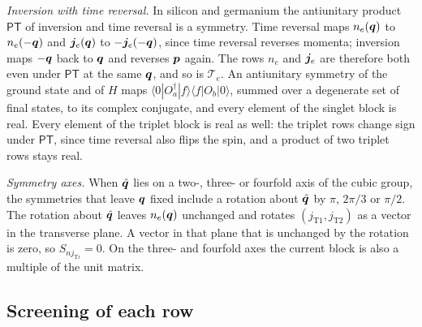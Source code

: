 \emph{Inversion with time reversal.} In silicon and germanium the antiunitary product $\mathsf{PT}$ of inversion and time reversal is a symmetry. Time reversal maps $n_e(\bm{q})$ to $n_e(-\bm{q})$ and $\bm{j}_e(\bm{q})$ to $-\bm{j}_e(-\bm{q})$, since time reversal reverses momenta; inversion maps $-\bm{q}$ back to $\bm{q}$ and reverses $\bm{p}$ again. The rows $n_e$ and $\bm{j}_e$ are therefore both even under $\mathsf{PT}$ at the same $\bm{q}$, and so is $\mathcal{T}_e$. An antiunitary symmetry of the ground state and of $H$ maps $\langle0|O_a^\dagger|f\rangle\langle f|O_b|0\rangle$, summed over a degenerate set of final states, to its complex conjugate, and every element of the singlet block is real. Every element of the triplet block is real as well: the triplet rows change sign under $\mathsf{PT}$, since time reversal also flips the spin, and a product of two triplet rows stays real.

\emph{Symmetry axes.} When $\hat{\bm{q}}$ lies on a two-, three- or fourfold axis of the cubic group, the symmetries that leave $\bm{q}$ fixed include a rotation about $\hat{\bm{q}}$ by $\pi$, $2\pi/3$ or $\pi/2$. The rotation about $\hat{\bm{q}}$ leaves $n_e(\bm{q})$ unchanged and rotates $(j_{\mathrm{T}1}, j_{\mathrm{T}2})$ as a vector in the transverse plane. A vector in that plane that is unchanged by the rotation is zero, so $S_{nj_{\mathrm{T}i}} = 0$. On the three- and fourfold axes the current block is also a multiple of the unit matrix.

\subsection{Screening of each row}

